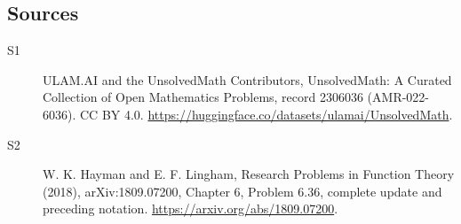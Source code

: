 \documentclass[11pt]{article}
\begin{document}
\subsection{Sources}
\begin{description}
\item[\hypertarget{source:2306036:1}{S1}] ULAM.AI and the UnsolvedMath Contributors, UnsolvedMath: A Curated Collection of Open Mathematics Problems, record 2306036 (AMR-022-6036). CC BY 4.0. \url{https://huggingface.co/datasets/ulamai/UnsolvedMath}.
\item[\hypertarget{source:2306036:2}{S2}] W. K. Hayman and E. F. Lingham, Research Problems in Function Theory (2018), arXiv:1809.07200, Chapter 6, Problem 6.36, complete update and preceding notation. \url{https://arxiv.org/abs/1809.07200}.
\end{description}
\label{end:2306036}
\end{document}
